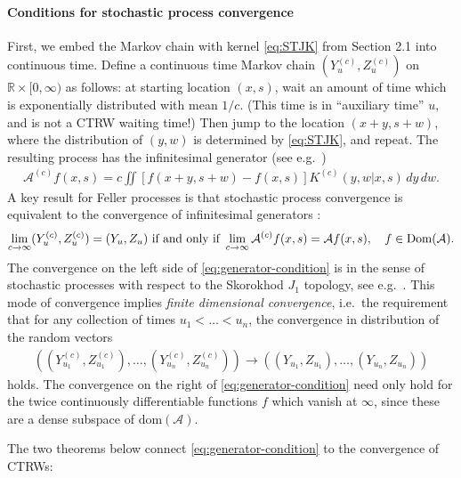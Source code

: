 \documentclass[a4paper,12pt]{elsarticle}
\numberwithin{equation}{section}
\theoremstyle{plain}
\theoremstyle{definition}
\theoremstyle{remark}
\numberwithin{equation}{section}
\newcommand{\spc}{\mathbb R}
\newcommand{\spctim}{\spc \times [0,\infty)}
\newcommand{\1}{\mathbf 1}
\begin{document}
\paragraph{Conditions for stochastic process convergence}
First, we embed the Markov chain with kernel \eqref{eq:STJK} from 
Section 2.1 into continuous time. Define a continuous time Markov 
chain $(Y^{(c)}_u, Z^{(c)}_u)$ on 
$\spctim$ as follows: at starting location $(x,s)$, wait an amount of time which is exponentially distributed with mean $1/c$. (This time is in ``auxiliary time'' $u$, and is not a CTRW waiting time!) Then jump to the location $(x+y, s+w)$, where the distribution of $(y,w)$ is determined by \eqref{eq:STJK}, and repeat. The resulting process has the infinitesimal generator
(see e.g.\ \cite[Proposition 17.2]{Kallenberg}) 
\begin{align} \label{eq:jump-process-generator}
\mathcal A^{(c)} f(x,s) = c \iint [f(x+y, s+w) - f(x,s)] K^{(c)}(y,w | x,s)\,dy\,dw.
\end{align}
A key result for Feller processes is that stochastic process convergence is equivalent to the convergence of infinitesimal generators \cite[Theorem 17.25]{Kallenberg}:
\begin{align} \label{eq:generator-condition}
\lim_{c \to \infty}(Y^{(c)}_u, Z^{(c)}_u) = (Y_u, Z_u)
\text{ if and only if }
\lim_{c \to \infty} \mathcal A^{(c)}f(x,s) = \mathcal A f(x,s), 
\quad f \in {\rm Dom}(\mathcal A).
\end{align}
The convergence on the left side of \eqref{eq:generator-condition} is in the sense of stochastic processes with respect to the Skorokhod $J_1$ topology, see e.g.\ \cite{Whitt2010}. This mode of convergence implies \emph{finite 
dimensional convergence}, i.e.\ the requirement that for any collection
of times $u_1 < \ldots < u_n$, the convergence in distribution of the 
random vectors
\begin{align}
\left((Y^{(c)}_{u_1}, Z^{(c)}_{u_1}), \ldots, (Y^{(c)}_{u_n}, Z^{(c)}_{u_n}) \right) 
\to 
\left((Y_{u_1}, Z_{u_1}), \ldots, (Y_{u_n}, Z_{u_n}) \right)
\end{align}
holds. 
The convergence on the right of \eqref{eq:generator-condition} 
need only hold for the twice continuously 
differentiable functions $f$ which vanish at $\infty$, since these are a 
dense subspace of $\text{dom}(\mathcal A)$. 

The two theorems below connect \eqref{eq:generator-condition} to the convergence of CTRWs: 
\end{document}
